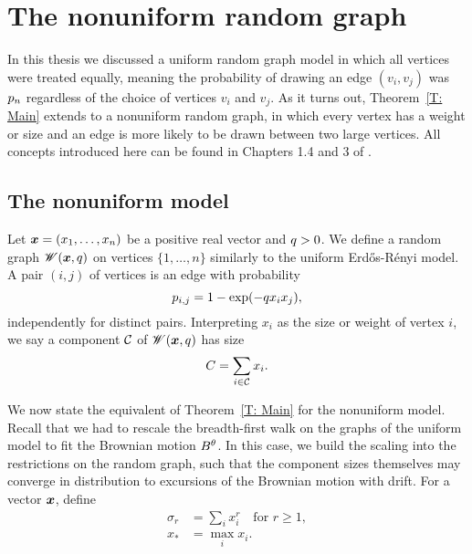 
\chapter{The nonuniform random graph} \label{C: nonuniform graph}

In this thesis we discussed a uniform random graph model in which all vertices were treated equally,
meaning the probability of drawing an edge $(v_i,v_j)$ was $p_n$ regardless of the choice of vertices $v_i$ and $v_j$.
As it turns out, Theorem~\ref{T: Main} extends to a nonuniform random graph,
in which every vertex has a weight or size and an edge is more likely to be drawn between two large vertices.
All concepts introduced here can be found in Chapters 1.4 and 3 of \cite{Aldous.1997}.

\section{The nonuniform model}
Let $\boldsymbol{x} = (x_1, \dots, x_n)$ be a positive real vector and $q > 0$.
We define a random graph $\mathscr{W}(\boldsymbol{x}, q)$ on vertices $\{1, \dots, n\}$ similarly to the uniform Erd\H{o}s-Rényi model.
A pair $(i, j)$ of vertices is an edge with probability
\begin{equation}
	p_{i,j} = 1 - \exp(-q x_i x_j),
\end{equation}
independently for distinct pairs.
Interpreting $x_i$ as the size or weight of vertex $i$, we say a component $\mathcal{C}$ of $\mathscr{W}(\boldsymbol{x}, q)$ has size
\begin{equation}
	C = \sum_{i \in \mathcal{C}} x_i.
\end{equation}

We now state the equivalent of Theorem~\ref{T: Main} for the nonuniform model.
Recall that we had to rescale the breadth-first walk on the graphs of the uniform model to fit the Brownian motion $B^{\theta}$.
In this case, we build the scaling into the restrictions on the random graph, 
such that the component sizes themselves may converge in distribution to excursions of the Brownian motion with drift.
For a vector $\boldsymbol{x}$, define
\begin{equation}
\begin{aligned}
	\sigma_r &= \sum_{i} x_i^r \quad \text{for $r \geq 1$}, \\
	x_* &= \max_i x_i.
\end{aligned}
\end{equation}


